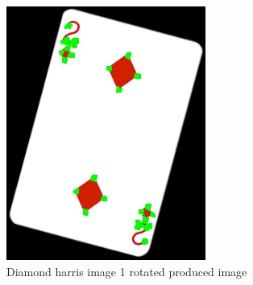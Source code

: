 \documentclass[conference]{IEEEtran}
\begin{document}
\begin{figure}[!htb]
\begin{minipage}[b]{0.2\textwidth}
    \includegraphics[width=\textwidth]{../programme/results/Task_1/rotated_experiements/Harris/diamond/image_1.jpg}
    \caption{Diamond harris image 1 rotated produced image}
    \label{Diamond harris image 1 rotated produced image}
  \end{minipage}
  \hfill
  \begin{minipage}[b]{0.2\textwidth}

\end{minipage}
\end{figure}
\end{document}
